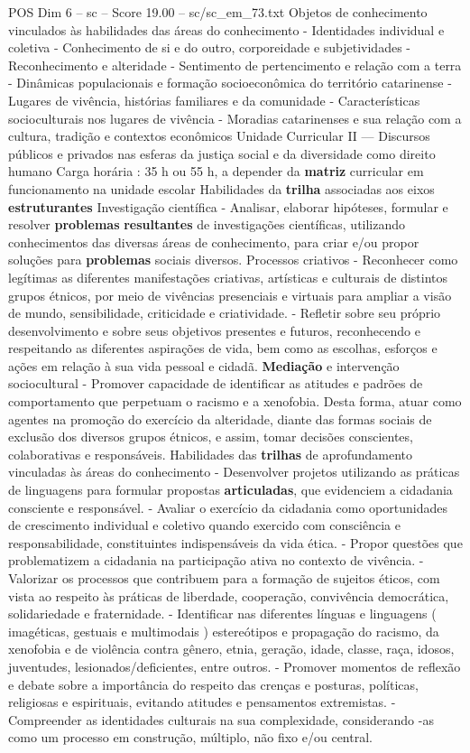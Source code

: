 \begin{textsample}{POS Dim 6 – sc – Score 19.00 – sc/sc\_em\_73.txt}
Objetos de conhecimento vinculados às habilidades das áreas do conhecimento - Identidades individual e coletiva - Conhecimento de si e do outro, corporeidade e subjetividades - Reconhecimento e alteridade - Sentimento de pertencimento e relação com a terra - Dinâmicas populacionais e formação socioeconômica do território catarinense - Lugares de vivência, histórias familiares e da comunidade - Características socioculturais nos lugares de vivência - Moradias catarinenses e sua relação com a cultura, tradição e contextos econômicos Unidade Curricular II — Discursos públicos e privados nas esferas da justiça social e da diversidade como direito humano Carga horária : 35 h ou 55 h, a depender da \textbf{matriz} curricular em funcionamento na unidade escolar Habilidades da \textbf{trilha} associadas aos eixos \textbf{estruturantes} Investigação científica - Analisar, elaborar hipóteses, formular e resolver \textbf{problemas} \textbf{resultantes} de investigações científicas, utilizando conhecimentos das diversas áreas de conhecimento, para criar e/ou propor soluções para \textbf{problemas} sociais diversos.
Processos criativos - Reconhecer como legítimas as diferentes manifestações criativas, artísticas e culturais de distintos grupos étnicos, por meio de vivências presenciais e virtuais para ampliar a visão de mundo, sensibilidade, criticidade e criatividade. - Refletir sobre seu próprio desenvolvimento e sobre seus objetivos presentes e futuros, reconhecendo e respeitando as diferentes aspirações de vida, bem como as escolhas, esforços e ações em relação à sua vida pessoal e cidadã. \textbf{Mediação} e intervenção sociocultural - Promover capacidade de identificar as atitudes e padrões de comportamento que perpetuam o racismo e a xenofobia.
Desta forma, atuar como agentes na promoção do exercício da alteridade, diante das formas sociais de exclusão dos diversos grupos étnicos, e assim, tomar decisões conscientes, colaborativas e responsáveis.
Habilidades das \textbf{trilhas} de aprofundamento vinculadas às áreas do conhecimento - Desenvolver projetos utilizando as práticas de linguagens para formular propostas \textbf{articuladas}, que evidenciem a cidadania consciente e responsável. - Avaliar o exercício da cidadania como oportunidades de crescimento individual e coletivo quando exercido com consciência e responsabilidade, constituintes indispensáveis da vida ética. - Propor questões que problematizem a cidadania na participação ativa no contexto de vivência. - Valorizar os processos que contribuem para a formação de sujeitos éticos, com vista ao respeito às práticas de liberdade, cooperação, convivência democrática, solidariedade e fraternidade. - Identificar nas diferentes línguas e linguagens ( imagéticas, gestuais e multimodais ) estereótipos e propagação do racismo, da xenofobia e de violência contra gênero, etnia, geração, idade, classe, raça, idosos, juventudes, lesionados/deficientes, entre outros. - Promover momentos de reflexão e debate sobre a importância do respeito das crenças e posturas, políticas, religiosas e espirituais, evitando atitudes e pensamentos extremistas. - Compreender as identidades culturais na sua complexidade, considerando -as como um processo em construção, múltiplo, não fixo e/ou central.

\end{textsample}
